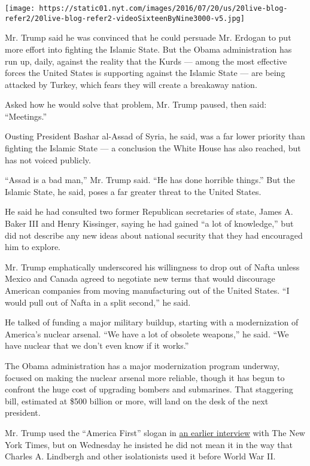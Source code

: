 \texttt{[image: https://static01.nyt.com/images/2016/07/20/us/20live-blog-refer2/20live-blog-refer2-videoSixteenByNine3000-v5.jpg]}

Mr. Trump said he was convinced that he could persuade Mr. Erdogan to
put more effort into fighting the Islamic State. But the Obama
administration has run up, daily, against the reality that the Kurds ---
among the most effective forces the United States is supporting against
the Islamic State --- are being attacked by Turkey, which fears they
will create a breakaway nation.

Asked how he would solve that problem, Mr. Trump paused, then said:
``Meetings.''

Ousting President Bashar al-Assad of Syria, he said, was a far lower
priority than fighting the Islamic State --- a conclusion the White
House has also reached, but has not voiced publicly.

``Assad is a bad man,'' Mr. Trump said. ``He has done horrible things.''
But the Islamic State, he said, poses a far greater threat to the United
States.

He said he had consulted two former Republican secretaries of state,
James A. Baker III and Henry Kissinger, saying he had gained ``a lot of
knowledge,'' but did not describe any new ideas about national security
that they had encouraged him to explore.

Mr. Trump emphatically underscored his willingness to drop out of Nafta
unless Mexico and Canada agreed to negotiate new terms that would
discourage American companies from moving manufacturing out of the
United States. ``I would pull out of Nafta in a split second,'' he said.

He talked of funding a major military buildup, starting with a
modernization of America's nuclear arsenal. ``We have a lot of obsolete
weapons,'' he said. ``We have nuclear that we don't even know if it
works.''

The Obama administration has a major modernization program underway,
focused on making the nuclear arsenal more reliable, though it has begun
to confront the huge cost of upgrading bombers and submarines. That
staggering bill, estimated at \$500 billion or more, will land on the
desk of the next president.

Mr. Trump used the ``America First'' slogan in
\href{https://www.nytimes.com/2016/03/27/us/politics/donald-trump-foreign-policy.html?_r=0}{an
earlier interview} with The New York Times, but on Wednesday he insisted
he did not mean it in the way that Charles A. Lindbergh and other
isolationists used it before World War II.

